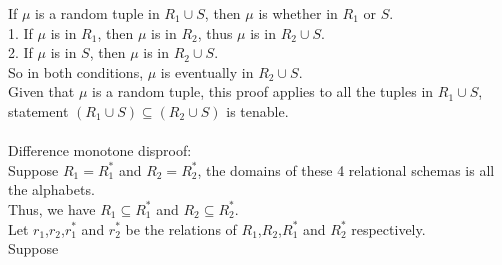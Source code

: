\documentclass{article}
\begin{document}
If $\mu$ is a random tuple in $R_{1}\cup S$, then $\mu$ is whether in $R_{1}$ or $S$.\\
1. If $\mu$ is in $R_{1}$, then $\mu$ is in $R_{2}$, thus  $\mu$ is in $R_{2}\cup S$.\\
2. If $\mu$ is in $S$, then $\mu$ is in $R_{2}\cup S$.\\
So in both conditions,  $\mu$ is eventually in $R_{2}\cup S$.\\
Given that $\mu$ is a random tuple, this proof applies to all the tuples in $R_{1}\cup S$, statement $(R_{1}\cup S)\subseteq (R_{2}\cup S)$ is tenable.\\
\\
Difference monotone disproof:\\
Suppose $R_{1}=R_{1}^{*}$ and $R_{2}=R_{2}^{*}$, the domains of these 4 relational schemas is all the alphabets.\\
Thus, we have $R_{1}\subseteq R_{1}^{*}$ and $R_{2}\subseteq R_{2}^{*}$.\\
Let $r_{1}$,$r_{2}$,$r_{1}^{*}$ and $r_{2}^{*}$ be the relations of $R_{1}$,$R_{2}$,$R_{1}^{*}$ and $R_{2}^{*}$ respectively.\\
Suppose
\end{document}
